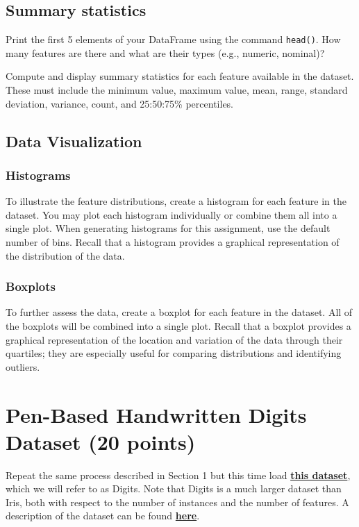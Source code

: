 \documentclass[paper=a4, fontsize=11pt]{scrartcl} %
\numberwithin{equation}{section} %
\numberwithin{figure}{section} %
\numberwithin{table}{section} %
\begin{document}
\subsection{Summary statistics}
\raggedright{Print the first 5 elements of your DataFrame using the command \texttt{head()}. How many features are there and what are their types (e.g., numeric, nominal)?}
\linebreak
\vspace{-3pt}

Compute and display summary statistics for each feature available in the dataset. These must include the minimum value, maximum value, mean, range, standard deviation, variance, count, and 25:50:75\% percentiles.

\subsection{Data Visualization}

\subsubsection{Histograms}
To illustrate the feature distributions, create a histogram for each feature in the dataset. You may plot each histogram individually or combine them all into a single plot. When generating histograms for this assignment, use the default number of bins. Recall that a histogram provides a graphical representation of the distribution of the data.

\subsubsection{Boxplots}
To further assess the data, create a boxplot for each feature in the dataset. All of the boxplots will be combined into a single plot. Recall that a boxplot provides a graphical representation of the location and variation of the data through their quartiles; they are especially useful for comparing distributions and identifying outliers.

\section{Pen-Based Handwritten Digits Dataset (20 points)}

    Repeat the same process described in Section 1 but this time load \textbf{\href{http://archive.ics.uci.edu/ml/machine-learning-databases/pendigits/pendigits.tra}{this dataset}}, which we will refer to as Digits. Note that Digits is a much larger dataset than Iris, both with respect to the number of instances and the number of features. A description of the dataset can be found \textbf{\href{http://archive.ics.uci.edu/ml/datasets/Pen-Based+Recognition+of+Handwritten+Digits}{here}}.
\end{document}
